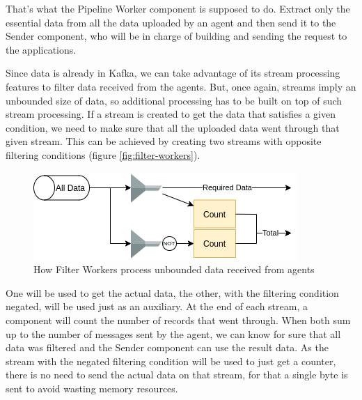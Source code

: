 That's what the Pipeline Worker component is supposed to do.
Extract only the essential data from all the data uploaded by an agent and then send it to the Sender component, who will be in charge of building and sending the request to the applications.

Since data is already in Kafka, we can take advantage of its stream processing features to filter data received from the agents.
But, once again, streams imply an unbounded size of data, so additional processing has to be built on top of such stream processing.
If a stream is created to get the data that satisfies a given condition, we need to make sure that all the uploaded data went through that given stream.
This can be achieved by creating two streams with opposite filtering conditions (figure \ref{fig:filter-workers}).
\begin{figure}[H]
    \center
    \includegraphics[width=.7\textwidth]{filter}
    \caption{How Filter Workers process unbounded data received from agents}
    \label{fig:filter}
\end{figure}
One will be used to get the actual data, the other, with the filtering condition negated, will be used just as an auxiliary.
At the end of each stream, a component will count the number of records that went through.
When both sum up to the number of messages sent by the agent, we can know for sure that all data was filtered and the Sender component can use the result data.
As the stream with the negated filtering condition will be used to just get a counter, there is no need to send the actual data on that stream, for that a single byte is sent to avoid wasting memory resources.

